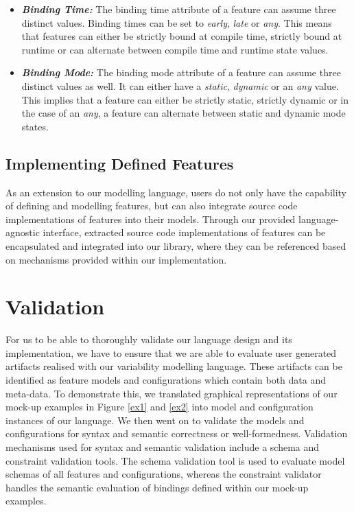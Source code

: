 \documentclass[conference]{IEEEtran}
\begin{document}
\begin{itemize}
\begin{itemize}
    \item \textit{\textbf{Binding Time:}} The binding time attribute of a feature can assume three distinct values. Binding times can be set to \textit{early}, \textit{late} or \textit{any}. This means that features can either be strictly bound at compile time, strictly bound at runtime or can alternate between compile time and runtime state values.
    
    \item \textit{\textbf{Binding Mode:}} The binding mode attribute of a feature can assume three distinct values as well. It can either have a \textit{static}, \textit{dynamic} or an \textit{any} value. This implies that a feature can either be strictly static, strictly dynamic or in the case of an \textit{any}, a feature can alternate between static and dynamic mode states.
\end{itemize}

\end{itemize}

\subsection{Implementing Defined Features}
As an extension to our modelling language, users do not only have the capability of defining and modelling features, but can also integrate source code implementations of features into their models. Through our provided language-agnostic interface, extracted source code implementations of features can be encapsulated and integrated into our library, where they can be referenced based on mechanisms provided within our implementation.

\section{Validation}
For us to be able to thoroughly validate our language design and its implementation, we have to ensure that we are able to evaluate user generated artifacts realised with our variability modelling language. These artifacts can be identified as feature models and configurations which contain both data and meta-data. To demonstrate this, we translated graphical representations of our mock-up examples in Figure \ref{ex1} and \ref{ex2} into model and configuration instances of our language. We then went on to validate the models and configurations for syntax and semantic correctness or well-formedness. Validation mechanisms used for syntax and semantic validation include a schema and constraint validation tools. The schema validation tool is used to evaluate model schemas of all features and configurations, whereas the constraint validator handles the semantic evaluation of bindings defined within our mock-up examples.
\end{document}
